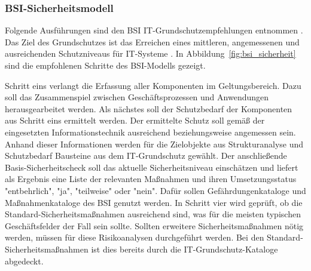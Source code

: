 \documentclass[11pt,a4paper]{report}
\begin{document}
\subsubsection{BSI-Sicherheitsmodell}

Folgende Ausführungen sind den BSI IT-Grundschutzempfehlungen entnommen \cite{bsi_grundsch1,bsi_grundsch2,bsi_grundsch3,bsi_grundsch4}.
Das Ziel des Grundschutzes ist das Erreichen eines mittleren, angemessenen und ausreichenden Schutzniveaus für IT-Systeme \cite{wiki_itgrundschutz}. In Abbildung~\ref{fig:bsi_sicherheit} sind die empfohlenen Schritte des BSI-Modells gezeigt. 

Schritt eins verlangt die Erfassung aller Komponenten im Geltungsbereich. Dazu soll das Zusammenspiel zwischen Geschäftsprozessen und Anwendungen herausgearbeitet werden. Als nächstes soll der Schutzbedarf der Komponenten aus Schritt eins ermittelt werden. Der ermittelte Schutz soll gemäß der eingesetzten Informationstechnik ausreichend beziehungsweise angemessen sein. Anhand dieser Informationen werden für die Zielobjekte aus Strukturanalyse und Schutzbedarf Bausteine aus dem IT-Grundschutz gewählt. Der anschließende Basis-Sicherheitscheck soll das aktuelle Sicherheitsniveau einschätzen und liefert als Ergebnis eine Liste der relevanten Maßnahmen und ihren Umsetzungsstatus "entbehrlich", "ja", "teilweise" oder "nein". Dafür sollen Gefährdungenkataloge und Maßnahmenkataloge des BSI genutzt werden. In Schritt vier wird geprüft, ob die Standard-Sicherheitsmaßnahmen ausreichend sind, was für die meisten typischen Geschäftsfelder der Fall sein sollte. Sollten erweitere Sicherheitsmaßnahmen nötig werden, müssen für diese Risikoanalysen durchgeführt werden. Bei den Standard-Sicherheitsmaßnahmen ist dies bereits durch die IT-Grundschutz-Kataloge abgedeckt. 
\end{document}
